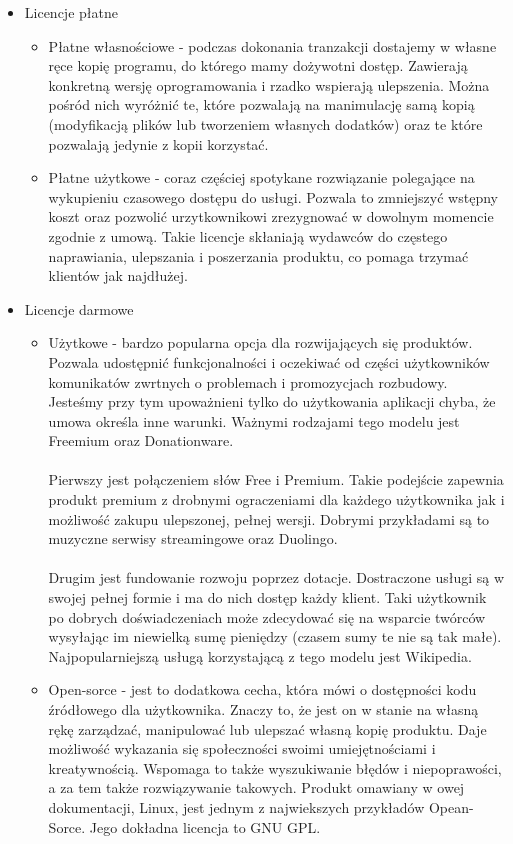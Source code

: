 \documentclass[10pt,a4paper]{report}
\begin{document}
\begin{itemize}
\item Licencje płatne
\begin{itemize}
\item Płatne własnościowe - podczas dokonania tranzakcji dostajemy w własne ręce kopię programu, do którego mamy dożywotni dostęp. Zawierają konkretną wersję oprogramowania i rzadko wspierają ulepszenia. Można pośród nich wyróżnić te, które pozwalają na manimulację samą kopią (modyfikacją plików lub tworzeniem własnych dodatków) oraz te które pozwalają jedynie z kopii korzystać.
\item Płatne użytkowe - coraz częściej spotykane rozwiązanie polegające na wykupieniu czasowego dostępu do usługi. Pozwala to zmniejszyć wstępny koszt oraz pozwolić urzytkownikowi zrezygnować w dowolnym momencie zgodnie z umową. Takie licencje skłaniają wydawców do częstego naprawiania, ulepszania i poszerzania produktu, co pomaga trzymać klientów jak najdłużej.
\end{itemize}
\item Licencje darmowe
\begin{itemize}
\item Użytkowe - bardzo popularna opcja dla rozwijających się produktów. Pozwala udostępnić funkcjonalności i oczekiwać od części użytkowników komunikatów zwrtnych o problemach i promozycjach rozbudowy. Jesteśmy przy tym upoważnieni tylko do użytkowania aplikacji chyba, że umowa określa inne warunki. Ważnymi rodzajami tego modelu jest Freemium oraz Donationware.\\\\ Pierwszy jest połączeniem słów Free i Premium. Takie podejście zapewnia produkt premium z drobnymi ograczeniami dla każdego użytkownika jak i możliwość zakupu ulepszonej, pełnej wersji. Dobrymi przykładami są to muzyczne serwisy streamingowe oraz Duolingo.\\\\ Drugim jest fundowanie rozwoju poprzez dotacje. Dostraczone usługi są w swojej pełnej formie i ma do nich dostęp każdy klient. Taki użytkownik po dobrych doświadczeniach może zdecydować się na wsparcie twórców wysyłając im niewielką sumę pieniędzy (czasem sumy te nie są tak małe). Najpopularniejszą usługą korzystającą z tego modelu jest Wikipedia.
\item Open-sorce - jest to dodatkowa cecha, która mówi o dostępności kodu źródłowego dla użytkownika. Znaczy to, że jest on w stanie na własną rękę zarządzać, manipulować lub ulepszać własną kopię produktu. Daje możliwość wykazania się społeczności swoimi umiejętnościami i kreatywnością. Wspomaga to także wyszukiwanie błędów i niepoprawości, a za tem także rozwiązywanie takowych. Produkt omawiany w owej dokumentacji, Linux, jest jednym z najwiekszych przykładów Opean-Sorce. Jego dokładna licencja to GNU GPL.
\end{itemize}
\end{itemize}
\end{document}
